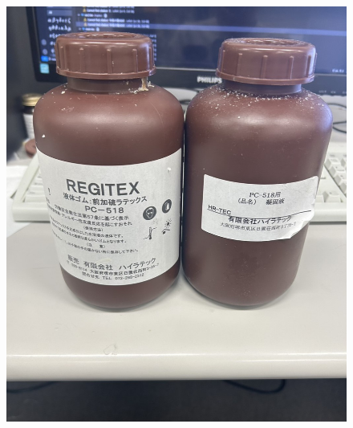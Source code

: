 \begin{figure}
\begin{minipage}[b]{0.29\hsize}
  \end{minipage}
  \begin{minipage}[b]{0.29\hsize}
    \centering
    \includegraphics[scale=0.1]{pic/gomu.jpg}
  

\end{minipage}
\end{figure}
